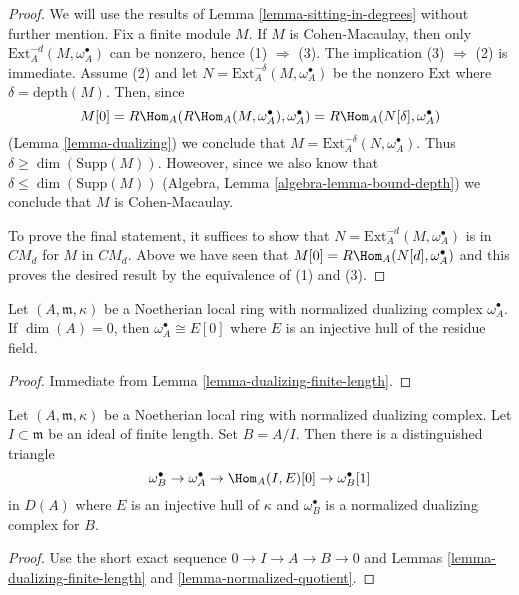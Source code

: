 \begin{proof}
We will use the results of Lemma \ref{lemma-sitting-in-degrees}
without further mention. Fix a finite module $M$.
If $M$ is Cohen-Macaulay, then only
$\text{Ext}^{-d}_A(M, \omega_A^\bullet)$ can be nonzero,
hence (1) $\Rightarrow$ (3).
The implication (3) $\Rightarrow$ (2) is immediate.
Assume (2) and let $N = \text{Ext}^{-\delta}_A(M, \omega_A^\bullet)$
be the nonzero $\text{Ext}$ where $\delta = \text{depth}(M)$. Then, since
$$
M[0] = R\Hom_A(R\Hom_A(M, \omega_A^\bullet), \omega_A^\bullet) =
R\Hom_A(N[\delta], \omega_A^\bullet)
$$
(Lemma \ref{lemma-dualizing})
we conclude that $M = \text{Ext}_A^{-\delta}(N, \omega_A^\bullet)$.
Thus $\delta \geq \dim(\text{Supp}(M))$. Howeover,
since we also know that $\delta \leq \dim(\text{Supp}(M))$
(Algebra, Lemma \ref{algebra-lemma-bound-depth}) we conclude that $M$ is
Cohen-Macaulay.

\medskip\noindent
To prove the final statement, it suffices to show that
$N = \text{Ext}^{-d}_A(M, \omega_A^\bullet)$ is in $CM_d$
for $M$ in $CM_d$. Above we have seen that
$M[0] = R\Hom_A(N[d], \omega_A^\bullet)$ and this proves the
desired result by the equivalence of (1) and (3).
\end{proof}

\begin{lemma}
\label{lemma-dualizing-artinian}
Let $(A, \mathfrak m, \kappa)$ be a Noetherian local
ring with normalized dualizing complex $\omega_A^\bullet$.
If $\dim(A) = 0$, then $\omega_A^\bullet \cong E[0]$
where $E$ is an injective hull of the residue field.
\end{lemma}

\begin{proof}
Immediate from Lemma \ref{lemma-dualizing-finite-length}.
\end{proof}

\begin{lemma}
\label{lemma-divide-by-finite-length-ideal}
Let $(A, \mathfrak m, \kappa)$ be a Noetherian local
ring with normalized dualizing complex. Let $I \subset \mathfrak m$ be an
ideal of finite length. Set $B = A/I$. Then there is a distinguished
triangle
$$
\omega_B^\bullet \to \omega_A^\bullet \to \Hom_A(I, E)[0] \to
\omega_B^\bullet[1]
$$
in $D(A)$ where $E$ is an injective hull of $\kappa$ and
$\omega_B^\bullet$ is a normalized dualizing complex for $B$.
\end{lemma}

\begin{proof}
Use the short exact sequence $0 \to I \to A \to B \to 0$
and Lemmas \ref{lemma-dualizing-finite-length} and
\ref{lemma-normalized-quotient}.
\end{proof}


